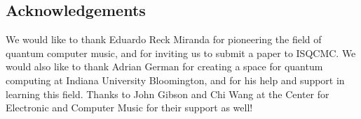 \documentclass[10pt,twocolumn]{article}
\begin{document}
\subsection{Acknowledgements}

We would like to thank Eduardo Reck Miranda for pioneering the field of quantum computer music, and for inviting us to submit a paper to ISQCMC. We would also like to thank Adrian German for creating a space for quantum computing at Indiana University Bloomington, and for his help and support in learning this field. Thanks to John Gibson and Chi Wang at the Center for Electronic and Computer Music for their support as well!







\end{document}
